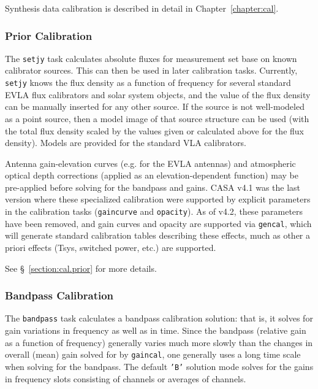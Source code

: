 Synthesis data calibration is described in detail in
Chapter~\ref{chapter:cal}. 

\subsubsection{Prior Calibration}
\label{section:intro.walkthru.calib.prior}

The {\tt setjy} task calculates absolute fluxes for measurement set
base on known calibrator sources.  This can then be used in later
calibration tasks.  Currently, {\tt setjy} knows the flux density as a
function of frequency for several standard EVLA flux calibrators and
solar system objects, and the value of the flux density can be
manually inserted for any other source.  If the source is not
well-modeled as a point source, then a model image of that source
structure can be used (with the total flux density scaled by the
values given or calculated above for the flux density).  Models are
provided for the standard VLA calibrators.

Antenna gain-elevation curves (e.g. for the EVLA antennas) and
atmospheric optical depth corrections (applied as an
elevation-dependent function) may be pre-applied before solving for
the bandpass and gains.  CASA v4.1 was the last version where
these specialized calibration were supported by explicit parameters
in the calibration tasks ({\tt gaincurve} and {\tt opacity}). 
As of v4.2, these parameters have been removed, and gain curves and
opacity are supported via {\tt gencal}, which will generate standard
calibration tables describing these effects, much as other a priori
effects (Tsys, switched power, etc.) are supported.  

See \S~\ref{section:cal.prior} for more details.

\subsubsection{Bandpass Calibration}
\label{section:intro.walkthru.calib.bpass}

The {\tt bandpass} task
calculates a bandpass calibration solution: that is, it solves for
gain variations in frequency as well as in time.   Since the bandpass
(relative gain as a function of frequency) generally varies much more slowly 
than the changes in overall (mean) gain solved for by {\tt gaincal}, one
generally uses a long time scale when solving for the bandpass. The
default {\tt 'B'} solution mode solves for the gains in frequency
slots consisting of channels or averages of channels.

